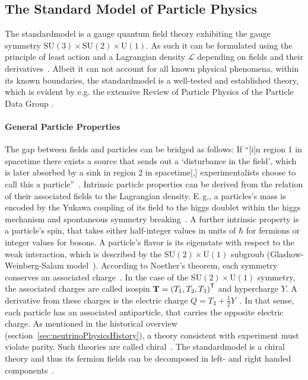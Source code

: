 \subsection{The Standard Model of Particle Physics}
\label{sec:neutrinoPhysicsStandardModelParticleProperties}
The \gls{standardmodel} is a gauge quantum field theory exhibiting the gauge symmetry $\text{SU}(3)\times\text{SU}(2)\times\text{U}(1)$. As such it can be formulated using the principle of least action and a Lagrangian density $\mathcal{L}$ depending on fields and their derivatives~\cite{zee2003quantum}. Albeit it can not account for all known physical phenomena, within its known boundaries, the \gls{standardmodel} is a well-tested and established theory, which is evident by e.g. the extensive Review of Particle Physics of the Particle Data Group \cite{ReviewOfParticlePhysics}.

\paragraph{General Particle Properties}
The gap between fields and particles can be bridged as follows: If ``[i]n region 1 in spacetime there exists a source that sends out a `disturbance in the field', which is later absorbed by a sink in region 2 in spacetime[,] experimentalists choose to call this a particle''~\cite{zee2003quantum}. Intrinsic particle properties can be derived from the relation of their associated fields to the Lagrangian density. E.\,g., a particles's mass is encoded by the Yukawa coupling of its field to the higgs doublet within the higgs mechanism and spontaneous symmetry breaking~\cite{Higgs:1964pj}. A further intrinsic property is a particle's spin, that takes either half-integer values in units of $\hbar$ for fermions or integer values for bosons. A particle's flavor is its eigenstate with respect to the weak interaction, which is described by the $\text{SU}(2)\times\text{U}(1)$ subgroub (Glashow-Weinberg-Salam model~\cite{Glashow:1961,Weinberg1967,Salam:1968}). According to Noether's theorem, each symmetry conserves an associated charge~\cite{Noether1918}. In the case of the $\text{SU}(2)\times\text{U}(1)$ symmetry, the associated charges are called isospin $\boldsymbol{\mathbf{T}}={(T_1, T_2, T_3)}^{\mathsf{T}}$ and hypercharge $Y$. A derivative from these charges is the electric charge $Q=T_3+\frac{1}{2}Y$~\cite{Wouter2019}. In that sense, each particle has an associated antiparticle, that carries the opposite electric charge. As mentioned in the historical overview (section~\ref{sec:neutrinoPhysicsHistory}), a theory consistent with experiment must violate parity. Such theories are called chiral~\cite{zee2003quantum}. The \gls{standardmodel} is a chiral theory and thus its fermion fields can be decomposed in left- and right handed components~\cite{Wouter2019}. 

